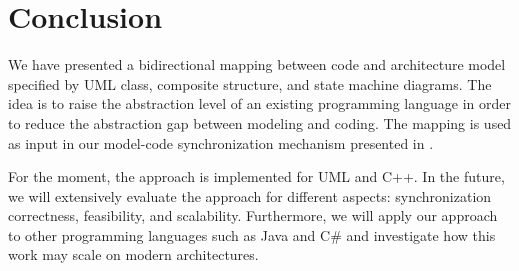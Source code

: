 \section{Conclusion}
\label{sec:conclusion}
We have presented a bidirectional mapping between code and architecture model specified by UML class, composite structure, and state machine diagrams.
The idea is to raise the abstraction level of an existing programming language in order to reduce the abstraction gap between modeling and coding.
The mapping is used as input in our model-code synchronization mechanism presented in \cite{foster2016}.

  

For the moment, the approach is implemented for UML and C++.
In the future, we will extensively evaluate the approach for different aspects: synchronization correctness, feasibility, and scalability. 
Furthermore, we will apply our approach to other programming languages such as Java and C\# and investigate how this work may scale on modern architectures. 


